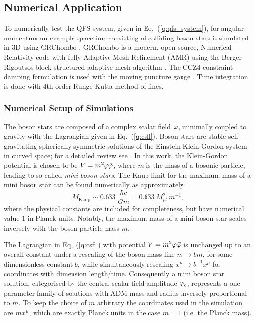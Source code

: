\subsection{Numerical Application} \label{q:sect:results}
To numerically test the QFS system, given in Eq.~(\ref{q:qfs_system}), for angular momentum an example spacetime consisting of colliding boson stars is simulated in 3D using {\sc GRChombo} \cite{clough2015grchombo} \cite{Andrade2021}. {\sc GRChombo} is a modern, open source, Numerical Relativity code with fully Adaptive Mesh Refinement (AMR) using the Berger-Rigoutsos block-structured adaptive
mesh algorithm \cite{PhysRevD.67.104005}. The CCZ4 constraint damping formulation \cite{PhysRevD.67.104005,PhysRevD.85.064040} is used with the moving puncture gauge \cite{PhysRevLett.96.111101,PhysRevLett.96.111102}. Time integration is done with 4th order Runge-Kutta method of lines.




\subsubsection{Numerical Setup of Simulations}

The boson stars are composed of a complex scalar field $\varphi$, minimally coupled to gravity with the Lagrangian given in Eq.~(\ref{q:csfl}). Boson stars are stable self-gravitating spherically symmetric solutions of the Einstein-Klein-Gordon system in curved space; for a detailed review see \cite{liebling2017dynamical}. In this work, the Klein-Gordon potential is chosen to be $V=m^2 \varphi \bar{\varphi}$, where $m$ is the mass of a bosonic particle, leading to so called {\it mini boson stars}. The Kaup limit for the maximum mass of a mini boson star can be found numerically as approximately
\begin{equation} M_{\mathrm{Kaup}} \sim 0.633 ~\frac{\hbar c}{G m} = 0.633 ~M_{pl}^2 ~m^{-1}, \end{equation}
where the physical constants are included for completeness, but have numerical value $1$ in Planck units. Notably, the maximum mass of a mini boson star scales inversely with the boson particle mass $m$.

The Lagrangian in Eq.~(\ref{q:csfl}) with potential $V=m^2 \varphi \bar{\varphi}$ is unchanged up to an overall constant under a rescaling of the boson mass like $m \rightarrow b m$, for some dimensionless constant $b$, while simultaneously rescaling $x^\mu \rightarrow b^{-1} x^\mu$ for coordinates with dimension length/time. Consequently a mini boson star solution, categorised by the central scalar field amplitude $\varphi_c$, represents a one parameter family of solutions with ADM mass and radius inversely proportional to $m$. To keep the choice of $m$ arbitrary the coordinates used in the simulation are $m x^\mu$, which are exactly Planck units in the case $m=1$ (i.e. the Planck mass).


